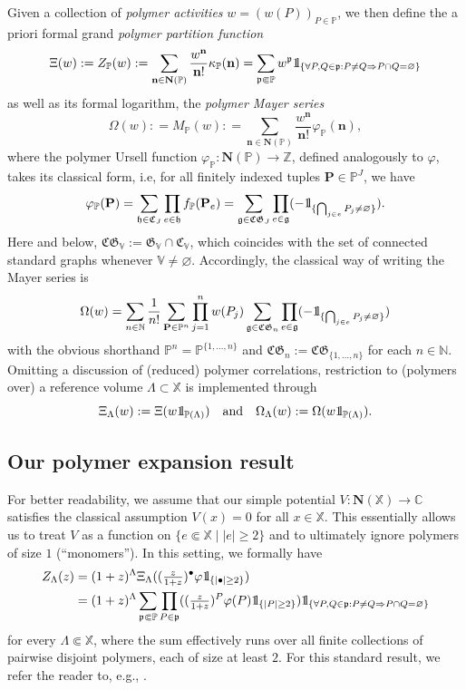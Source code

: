 \documentclass[10pt,a4paper]{amsart}
\newcommand{\N}{\mathbb{N}}
\newcommand{\Z}{\mathbb{Z}}
\newcommand{\C}{\mathbb{C}}
\renewcommand{\P}{\mathbb{P}}
\newcommand{\X}{\mathbb X}
\newcommand{\V}{\mathbb V}
\def\1{{\mathchoice {1\mskip-4mu\mathrm l}      
{1\mskip-4mu\mathrm l}
{1\mskip-4.5mu\mathrm l} {1\mskip-5mu\mathrm l}}}
\begin{document}
Given a collection of \emph{polymer activities} $w = (w(P))_{P \in \P}$,
we then define the a priori formal grand \emph{polymer partition function}
\[
	\Xi(w) : = Z_\P(w) : = \sum_{\mathbf n \in \mathbf N(\P)} \frac{w^\mathbf n}{\mathbf n!} \kappa_\P(\mathbf n) =\sum_{\mathfrak p \Subset \P} w^\mathfrak p \1_{\{\forall P, Q \in \mathfrak p : P \neq Q \Rightarrow P\cap Q = \varnothing\}}
\]
as well as its formal logarithm, the \emph{polymer Mayer series}
\[
	\Omega(w) : = M_\P(w) : = \sum_{\mathbf n \in \mathbf N(\P)} \frac{w^\mathbf n}{\mathbf n!} \varphi_\P(\mathbf n),
\]
where the polymer Ursell function $\varphi_\P : \mathbf N(\P) \to \Z$, defined analogously to $\varphi$, takes its classical form, i.e, for all finitely indexed tuples $\mathbf P \in \P^J$, we have
\[
	\varphi_\P(\mathbf P) = \sum_{\mathfrak h \in \mathfrak C_J} \prod_{e \in \mathfrak h} f_\P(\mathbf P_e) = \sum_{\mathfrak g \in \mathfrak{CG}_J} \prod_{e \in \mathfrak g} (-\1_{\{\bigcap_{j\in e} P_j \neq \varnothing\}}).
\]
Here and below, $\mathfrak{CG}_\V := \mathfrak G_\V \cap \mathfrak C_\V$, which coincides with the set of connected standard graphs whenever $\V\neq\varnothing$. 
Accordingly, the classical way of writing the Mayer series is
\[
	\Omega(w) = \sum_{n\in\N} \frac{1}{n!} \sum_{\mathbf P \in \P^n} \prod_{j=1}^n w(P_j) \sum_{\mathfrak g \in \mathfrak{CG}_n} \prod_{e \in \mathfrak g} (-\1_{\{\bigcap_{j\in e} P_j \neq \varnothing\}})
\]
with the obvious shorthand $\P^n = \P^{\{1,\ldots,n\}}$ and $\mathfrak{CG}_n := \mathfrak{CG}_{\{1,\ldots,n\}}$ for each $n \in \N$. 
Omitting a discussion of (reduced) polymer correlations, restriction to (polymers over) a reference volume $\Lambda \subset \X$ is implemented through
\[
	\Xi_\Lambda(w) : = \Xi(w \1_{\P(\Lambda)}) \quad \text{and} \quad \Omega_\Lambda(w) : = \Omega(w \1_{\P(\Lambda)}).
\]

\subsection{Our polymer expansion result}

For better readability, we assume that our simple potential $V : \mathbf N(\X) \to \C$ satisfies the classical assumption $V(x) = 0$ for all $x \in \X$. 
This essentially allows us to treat $V$ as a function on $\{e \Subset \X \mid |e| \geq 2\}$ and to ultimately ignore polymers of size $1$ (``monomers''). 
In this setting, we formally have
\begin{align*}
	Z_\Lambda(z) &= (1+z)^\Lambda \Xi_\Lambda(({\textstyle \frac{z}{1+z}})^\bullet \varphi \1_{\{|\bullet| \geq 2\}}) \\
	&= (1+z)^\Lambda \sum_{\mathfrak p \Subset \P} \prod_{P \in \mathfrak p} (({\textstyle \frac{z}{1+z}})^P \varphi(P) \1_{\{|P| \geq 2\}}) \1_{\{\forall P, Q \in \mathfrak p : P \neq Q \Rightarrow P\cap Q = \varnothing\}}
\end{align*}
for every $\Lambda \Subset \X$, where the sum effectively runs over all finite collections of pairwise disjoint polymers, each of size at least $2$.
For this standard result, we refer the reader to, e.g., \cite[Section~7]{ref:procacci-scoppola}. 
\end{document}
